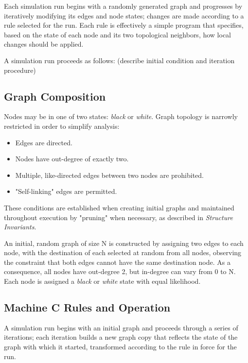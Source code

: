 \documentclass[twoside,twocolumn]{article}
\begin{document}
Each simulation run begins with a randomly generated graph and progresses by
iteratively modifying its edges and node states; changes are made according to a rule selected
for the run. Each rule is effectively a simple program  that specifies, based on the state
of each node and its two topological neighbors, how local changes should be applied.

A simulation run proceeds as follows: (describe initial condition and iteration procedure)

\subsection{Graph Composition}

Nodes may be in one of two states: \textit{black} or \textit{white}.
Graph topology is narrowly restricted in order to simplify analysis:

\begin{itemize}
    \item Edges are directed.
    \item Nodes have out-degree of exactly two.
    \item Multiple, like-directed edges between two nodes are prohibited.
    \item "Self-linking" edges are permitted.
\end{itemize}

These conditions are established when creating initial graphs and maintained
throughout execution by "pruning" when necessary, as described in \textit{Structure Invariants}.

An initial, random graph of size N is constructed by assigning two edges to each node, with
the destination of each selected at random from all nodes, observing the
constraint that both edges cannot have the same destination node. As a consequence,
all nodes have out-degree 2, but in-degree can vary from 0 to N. Each node is assigned
a \textit{black} or \textit{white} state with equal likelihood.

\subsection{Machine \textbf{C} Rules and Operation}

A simulation run begins with an initial graph and proceeds through a series of
iterations; each iteration builds a new graph copy that reflects the state of the graph
with which it started, transformed according to the rule in force for the run.
\end{document}
